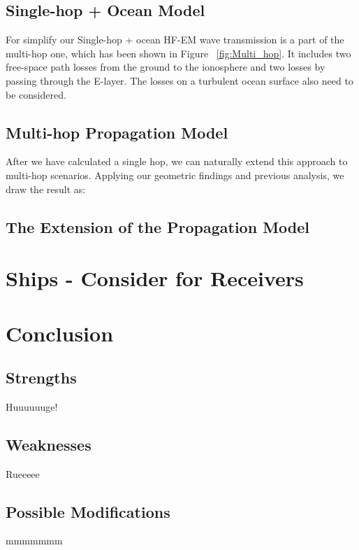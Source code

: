 \documentclass{mcmthesis}
\begin{document}
    \subsection{Single-hop + Ocean Model}

      For simplify our Single-hop + ocean HF-EM wave transmission is a part of the multi-hop one, which has been shown in Figure ~\ref{fig:Multi_hop}. It includes two free-space path losses from the ground to the ionosphere and two losses by passing through the E-layer. The losses on a turbulent ocean surface also need to be considered.


    \subsection{Multi-hop Propagation Model}

      After we have calculated a single hop, we can naturally extend this approach to multi-hop scenarios. Applying our geometric findings and previous analysis, we draw the result as:

    \subsection{The Extension of the Propagation Model}

\section{Ships - Consider for Receivers}

\section{Conclusion}
  \subsection{Strengths}
    Huuuuuuge!
  \subsection{Weaknesses}
    Rueeeee
  \subsection{Possible Modifications}
    mmmmmmm


\newpage
%
%
\end{document}
